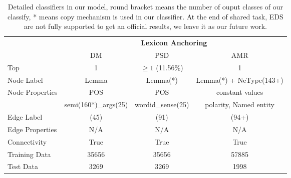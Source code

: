 \begin{table}[!ht]
\begin{center}
\small
\begin{tabular}{l|ccc}
\toprule
\hline
                                 & \multicolumn{3}{c}{{\bf Lexicon Anchoring}}                        \\ \cline{2-4}
                                 & DM                   & PSD               & AMR                     \\ \hline
Top                              & 1                    & $ \geq 1$ (11.56\%)  & 1                       \\ \hline
Node Label                       & Lemma                & Lemma(*)          & Lemma(*) + NeType(143+) \\ \hline
\multirow{2}{*}{Node Properties} & POS                  & POS               & constant values         \\
                                 & semi(160*)\_args(25) & wordid\_sense(25) & polarity, Named entity  \\ \hline
Edge Label                       & (45)                 & (91)              & (94+)                   \\ \hline
Edge Properties                  & N/A                  & N/A               & N/A                     \\ \hline
Connectivity                     & True                 & True              & True                    \\ \hline
Training Data                    & 35656                & 35656             & 57885                   \\ \hline
Test Data                        & 3269                 & 3269              & 1998                    \\ \hline \bottomrule
\end{tabular}
\end{center}
\caption{Detailed classifiers in our model, round bracket means the
  number of ouput classes of our classify, * means copy mechanism is
  used in our classifier. At the end of shared task, EDS are not fully supported to get an official results, we leave it as our future work.}
\label{tbl:lex:impl_lex}
\end{table}


